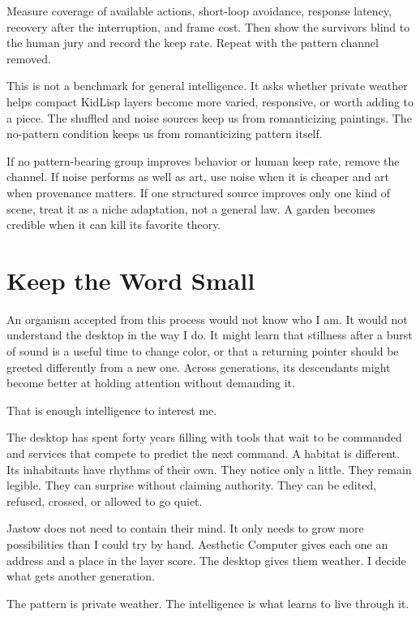 \documentclass[10pt,letterpaper]{article}
\begin{document}
Measure coverage of available actions, short-loop avoidance, response latency, recovery after the interruption, and frame cost. Then show the survivors blind to the human jury and record the keep rate. Repeat with the pattern channel removed.

This is not a benchmark for general intelligence. It asks whether private weather helps compact KidLisp layers become more varied, responsive, or worth adding to a piece. The shuffled and noise sources keep us from romanticizing paintings. The no-pattern condition keeps us from romanticizing pattern itself.

If no pattern-bearing group improves behavior or human keep rate, remove the channel. If noise performs as well as art, use noise when it is cheaper and art when provenance matters. If one structured source improves only one kind of scene, treat it as a niche adaptation, not a general law. A garden becomes credible when it can kill its favorite theory.

\section{Keep the Word Small}

An organism accepted from this process would not know who I am. It would not understand the desktop in the way I do. It might learn that stillness after a burst of sound is a useful time to change color, or that a returning pointer should be greeted differently from a new one. Across generations, its descendants might become better at holding attention without demanding it.

That is enough intelligence to interest me.

The desktop has spent forty years filling with tools that wait to be commanded and services that compete to predict the next command. A habitat is different. Its inhabitants have rhythms of their own. They notice only a little. They remain legible. They can surprise without claiming authority. They can be edited, refused, crossed, or allowed to go quiet.

Jastow does not need to contain their mind. It only needs to grow more possibilities than I could try by hand. Aesthetic Computer gives each one an address and a place in the layer score. The desktop gives them weather. I decide what gets another generation.

The pattern is private weather. The intelligence is what learns to live through it.

\end{document}
